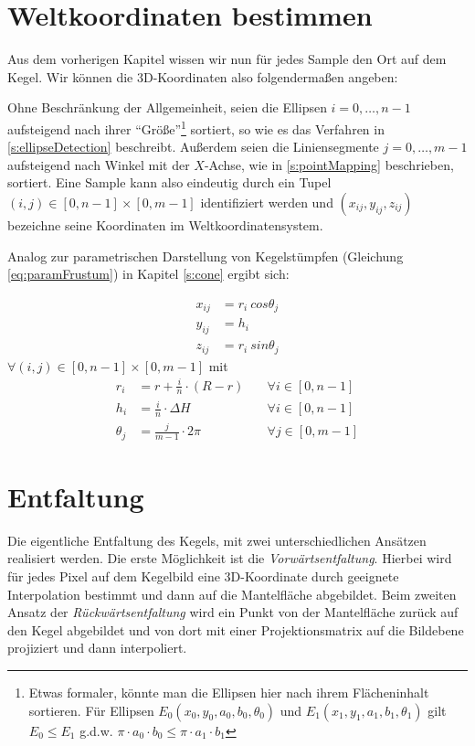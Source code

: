 \section{Weltkoordinaten bestimmen}

Aus dem vorherigen Kapitel wissen wir nun für jedes Sample den Ort auf dem Kegel. Wir können die 3D-Koordinaten also folgendermaßen angeben:

Ohne Beschränkung der Allgemeinheit, seien die Ellipsen $i = 0,\dotsc,n - 1$ aufsteigend nach ihrer "`Größe"'\footnote{Etwas formaler, könnte man die Ellipsen hier nach ihrem Flächeninhalt sortieren. Für Ellipsen $E_0(x_0,y_0,a_0, b_0, \theta_0)$ und $E_1(x_1,y_1,a_1, b_1,\theta_1)$ gilt $E_0 \leq E_1$ g.d.w. $\pi\cdot a_0 \cdot b_0 \leq \pi \cdot a_1 \cdot b_1$} sortiert, so wie es das Verfahren in \ref{s:ellipseDetection} beschreibt.
Außerdem seien die Liniensegmente $j = 0,\dotsc,m - 1$ aufsteigend nach Winkel mit der $X$-Achse, wie in \ref{s:pointMapping} beschrieben, sortiert. 
Eine Sample kann also eindeutig durch ein Tupel $(i,j) \in [0,n-1]\times [0,m-1]$ identifiziert werden und $(x_{ij},y_{ij},z_{ij})$ bezeichne seine Koordinaten im Weltkoordinatensystem. 

Analog zur parametrischen Darstellung von Kegelstümpfen (Gleichung \ref{eq:paramFrustum}) in Kapitel \ref{s:cone} ergibt sich:

\begin{equation*}
\begin{aligned}
x_{ij} &= r_i~cos \theta_j \\
y_{ij} &= h_i\\
z_{ij} &= r_i~sin \theta_j
\end{aligned}
\end{equation*}
$\forall (i,j) \in [0,n-1]\times [0,m-1]$ mit 
\begin{equation*}
\begin{aligned}
r_i &= r + \frac{i}{n}\cdot(R - r) \quad&\forall i\in[0,n-1]\\
h_i &= \frac{i}{n}\cdot\Delta H &\forall i\in[0,n-1]\\
\theta_j &= \frac{j}{m-1} \cdot  2\pi  &\forall j\in[0,m-1]
\end{aligned}
\end{equation*}

\section{Entfaltung}
Die eigentliche Entfaltung des Kegels, mit zwei unterschiedlichen Ansätzen realisiert werden. 
Die erste Möglichkeit ist die \textit{Vorwärtsentfaltung}. Hierbei wird für jedes Pixel auf dem Kegelbild eine 3D-Koordinate durch geeignete Interpolation bestimmt und dann auf die Mantelfläche abgebildet. Beim zweiten Ansatz der  \textit{Rückwärtsentfaltung} wird ein Punkt von der Mantelfläche zurück auf den Kegel abgebildet und von dort mit einer Projektionsmatrix auf die Bildebene projiziert und dann interpoliert. 

